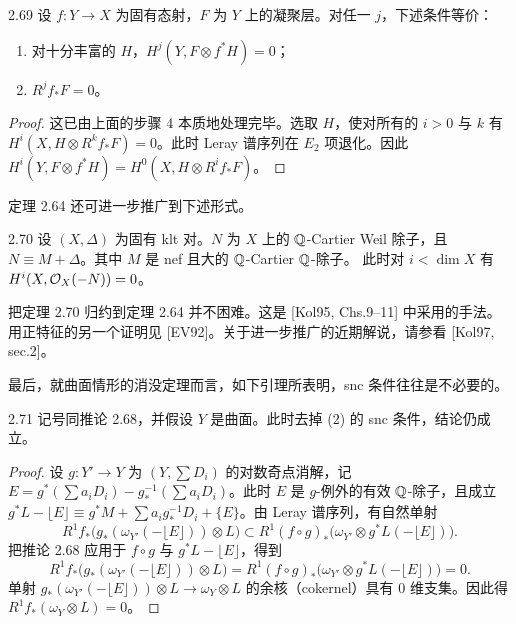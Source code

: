 \begin{propositionp}{2.69}
设 $f:Y\to X$ 为固有态射，$F$ 为 $Y$ 上的凝聚层。对任一 $j$，下述条件等价：
\begin{enumerate}[label=（\arabic*）,leftmargin=2.8em]
\item 对十分丰富的 $H$，$H^j(Y,F\otimes f^*H)=0$；
\item $R^jf_*F=0$。
\end{enumerate}
\end{propositionp}

\begin{proof}
这已由上面的步骤 4 本质地处理完毕。选取 $H$，使对所有的 $i>0$ 与 $k$ 有 $H^i(X,H\otimes R^kf_*F)=0$。此时 Leray 谱序列在 $E_2$ 项退化。因此 $H^i(Y,F\otimes f^*H)=H^0(X,H\otimes R^if_*F)$。
\end{proof}

定理 2.64 还可进一步推广到下述形式。

\begin{theorem*}[一般小平消没定理]{2.70}
设 $(X,\Delta)$ 为固有 klt 对。$N$ 为 $X$ 上的 $\mathbb{Q}$-Cartier Weil 除子，且 $N\equiv M+\Delta$。其中 $M$ 是 nef 且大的 $\mathbb{Q}$-Cartier $\mathbb{Q}$-除子。
此时对 $i<\dim X$ 有 $H^i(X,\mathcal{O}_X(-N))=0$。
\end{theorem*}

把定理 2.70 归约到定理 2.64 并不困难。这是 [Kol95, Chs.9–11] 中采用的手法。用正特征的另一个证明见 [EV92]。关于进一步推广的近期解说，请参看 [Kol97, sec.2]。

最后，就曲面情形的消没定理而言，如下引理所表明，snc 条件往往是不必要的。

\begin{propositionp}{2.71}
记号同推论 2.68，并假设 $Y$ 是曲面。此时去掉 (2) 的 snc 条件，结论仍成立。
\end{propositionp}

\begin{proof}
设 $g:Y'\to Y$ 为 $(Y,\sum D_i)$ 的对数奇点消解，记 $E=g^*(\sum a_iD_i)-g_*^{-1}(\sum a_iD_i)$。此时 $E$ 是 $g$-例外的有效 $\mathbb{Q}$-除子，且成立 $g^*L-\lfloor E\rfloor\equiv g^*M+\sum a_ig_*^{-1}D_i+\{E\}$。由 Leray 谱序列，有自然单射
\[
R^1f_*\bigl(g_*(\omega_{Y'}(-\lfloor E\rfloor))\otimes L\bigr)\subset R^1(f\circ g)_*\bigl(\omega_{Y'}\otimes g^*L(-\lfloor E\rfloor)\bigr).
\]
把推论 2.68 应用于 $f\circ g$ 与 $g^*L-\lfloor E\rfloor$，得到
\[
R^1f_*\bigl(g_*(\omega_{Y'}(-\lfloor E\rfloor))\otimes L\bigr)=R^1(f\circ g)_*\bigl(\omega_{Y'}\otimes g^*L(-\lfloor E\rfloor)\bigr)=0.
\]
单射 $g_*(\omega_{Y'}(-\lfloor E\rfloor))\otimes L\to\omega_Y\otimes L$ 的余核（cokernel）具有 0 维支集。因此得 $R^1f_*(\omega_Y\otimes L)=0$。
\end{proof}

